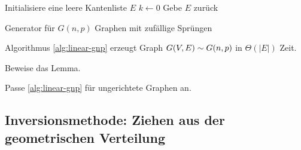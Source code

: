 \begin{algorithm}
    Initialisiere eine leere Kantenliste $E$\;
    $k \gets 0$\;
    Gebe $E$ zurück
    \caption{Generator für $G(n,p)$ Graphen mit zufällige Sprüngen}
    \label{alg:linear-gnp}
\end{algorithm}

\begin{lemma}
    \label{lem:linear-gnp}
    Algorithmus \ref{alg:linear-gnp} erzeugt Graph $G(V, E) \sim G(n, p)$ in $\Theta(|E|)$ Zeit.
\end{lemma}

\begin{exercise}
    Beweise das Lemma.
\end{exercise}
\begin{exercise}
    Passe \cref{alg:linear-gnp} für ungerichtete Graphen an.
\end{exercise}

\subsection{Inversionsmethode: Ziehen aus der geometrischen Verteilung}
\label{sec:inversionsmethode}

